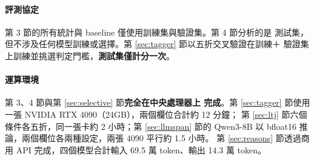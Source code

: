 \documentclass[11pt,a4paper]{ctexart}
\begin{document}
\paragraph{評測協定} 第 3 節的所有統計與 baseline 僅使用訓練集與驗證集。第 4 節分析的是
測試集，但不涉及任何模型訓練或選擇。第 \ref{sec:tagger} 節以五折交叉驗證在訓練＋
驗證集上訓練並挑選判定門檻，\textbf{測試集僅計分一次}。

\paragraph{運算環境} 第 3、4 節與第 \ref{sec:selective} 節\textbf{完全在中央處理器上
完成}。第 \ref{sec:tagger} 節使用一張 NVIDIA RTX 4090（24GB），兩個欄位合計約 12 分鐘；
第 \ref{sec:ltj} 節六個條件各五折，同一張卡約 2 小時；第 \ref{sec:llmspan} 節的
Qwen3-8B 以 bfloat16 推論，兩個欄位各兩種設定，兩張 4090 平行約 1.5 小時。
第 \ref{sec:reasons} 節透過商用 API 完成，四個模型合計輸入 69.5 萬 token、輸出
14.3 萬 token。
\end{document}
